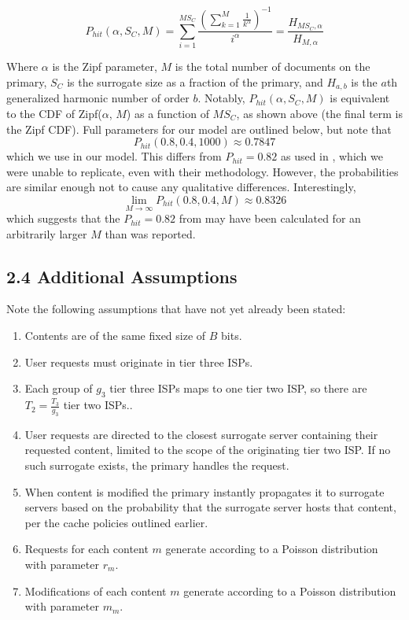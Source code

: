 \documentclass[
	a4paper, %
	10pt, %
	unnumberedsections, %
	twoside, %
]{LTJournalArticle}
\begin{document}
\[ P_{hit}(\alpha, S_C, M) = \sum_{i=1}^{MS_C} \frac{\left( \sum_{k=1}^{M} \frac{1}{k^\alpha}\right)^{-1}}{i^\alpha} = \frac{H_{MS_C, \alpha}}{H_{M,\alpha}} \]

Where $\alpha$ is the Zipf parameter, $M$ is the total number of documents on the primary,  $S_C$ is the surrogate size as a fraction of the primary, and $H_{a,b}$ is the $a$th generalized harmonic number of order $b$. Notably, $P_{hit}(\alpha, S_C, M)$ is equivalent to the CDF of Zipf($\alpha$, $M$) as a function of $MS_C$, as shown above (the final term is the Zipf CDF). Full parameters for our model are outlined below, but note that 
\[P_{hit}(0.8, 0.4, 1000) \approx 0.7847\] 
which we use in our model. This differs from $P_{hit} = 0.82$ as used in \cite{biancoCDNs2017}, which we were unable to replicate, even with their methodology. However, the probabilities are similar enough not to cause any qualitative differences. Interestingly,
\[ \lim_{M\to\infty} P_{hit}(0.8, 0.4, M) \approx 0.8326\]
which suggests that the $P_{hit} = 0.82$ from \cite{biancoCDNs2017} may have been calculated for an arbitrarily larger $M$ than was reported.

\subsection{2.4  Additional Assumptions}
Note the following assumptions that have not yet already been stated:
\begin{enumerate}
    \item Contents are of the same fixed size of $B$ bits.
    \item User requests must originate in tier three ISPs.
    \item Each group of $g_3$ tier three ISPs maps to one tier two ISP, so there are $T_2=\frac{T_3}{g_3}$ tier two ISPs..
    \item User requests are directed to the closest surrogate server containing their requested content, limited to the scope of the originating tier two ISP. If no such surrogate exists, the primary handles the request.
    \item When content is modified the primary instantly propagates it to surrogate servers based on the probability that the surrogate server hosts that content, per the cache policies outlined earlier.
    \item Requests for each content $m$ generate according to a Poisson distribution with parameter $r_m$.
    \item Modifications of each content $m$ generate according to a Poisson distribution with parameter $m_m$.
\end{enumerate}
\end{document}

